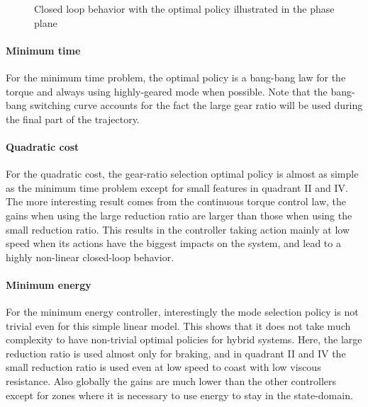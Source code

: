 %
\begin{figure}[p]
				\vspace{-2pt}
        \centering
        \caption[Closed loop behavior in the phase plane]{Closed loop behavior with the optimal policy illustrated in the phase plane}\label{fig:phase_plane}
\end{figure}

\paragraph{Minimum time}
\label{sec:MinimumTime}
For the minimum time problem, the optimal policy is a bang-bang law for the torque and always using highly-geared mode when possible. Note that the bang-bang switching curve accounts for the fact the large gear ratio will be used during the final part of the trajectory.

\paragraph{Quadratic cost}
\label{sec:QuadraticCost}
For the quadratic cost, the gear-ratio selection optimal policy is almost as simple as the minimum time problem except for small features in quadrant II and IV. The more interesting result comes from the continuous torque control law, the gains when using the large reduction ratio are larger than those when using the small reduction ratio. This results in the controller taking action mainly at low speed when its actions have the biggest impacts on the system, and lead to a highly non-linear closed-loop behavior.

\paragraph{Minimum energy}
\label{sec:MinimumEnergy}
For the minimum energy controller, interestingly the mode selection policy is not trivial even for this simple linear model.  This shows that it does not take much complexity to have non-trivial optimal policies for hybrid systems. Here, the large reduction ratio is used almost only for braking, and in quadrant II and IV the small reduction ratio is used even at low speed to coast with low viscous resistance. Also globally the gains are much lower than the other controllers except for zones where it is necessary to use energy to stay in the state-domain. 

